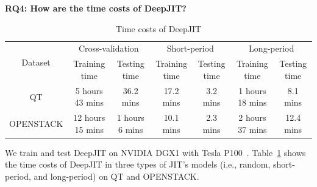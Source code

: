 \noindent \textbf{RQ4: How are the time costs of DeepJIT?}
\begin{table}[t!]
  \centering
  \caption{Time costs of DeepJIT}
    \begin{tabular}{|c|c|c|c|c|c|c|}
    \hline
    \multicolumn{1}{|c|}{\multirow{2}[4]{*}{Dataset}} & \multicolumn{2}{c|}{Cross-validation} & \multicolumn{2}{c|}{Short-period} & \multicolumn{2}{c|}{Long-period} \\
\cline{2-7}          & Training time & Testing time & Training time & Testing time & Training time & Testing time \\
    \hline
    \hline
    QT    & 5 hours 43 mins & 36.2 mins & 17.2 mins & 3.2 mins & 1 hours 18 mins & 8.1 mins \\
    \hline
    OPENSTACK & 12 hours 15 mins & 1 hours 6 mins & 10.1 mins & 2.3 mins & 2 hours 37 mins & 12.4 mins \\
    \hline
    \end{tabular}%
  \label{tab:cost}%
\end{table}%

We train and test DeepJIT on NVIDIA DGX1 with Tesla P100~\cite{gawande2018scaling}. Table~\ref{tab:cost} shows the time costs of DeepJIT in three types of JIT's models (i.e., random, short-period, and long-period) on QT and OPENSTACK. 

